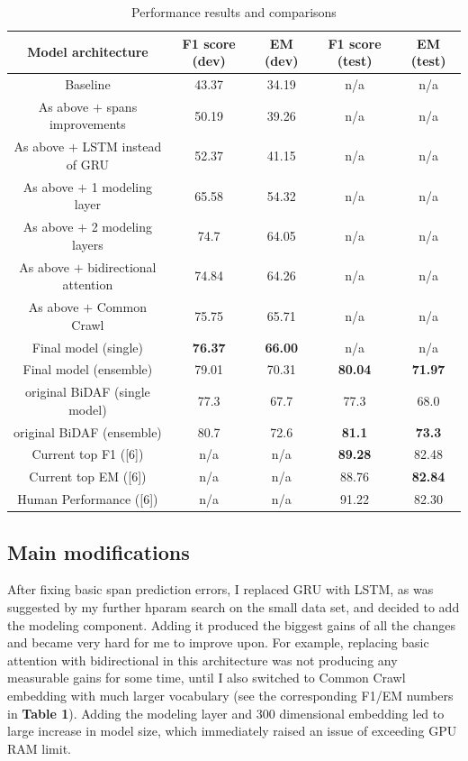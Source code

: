 \documentclass{article}
\begin{document}
\begin{table}[h!]
\centering
\setlength{\arrayrulewidth}{0.5mm}
\begin{tabular}{|c || c | c | c | c |} 
 \hline
 Model architecture & F1 score (dev) & EM (dev) & F1 score (test) & EM (test) \\
 \hline
 Baseline & 43.37 & 34.19 & n/a & n/a \\ 
 As above $+$ spans improvements & 50.19 & 39.26 & n/a & n/a \\
 As above $+$ LSTM instead of GRU & 52.37 & 41.15 & n/a & n/a \\
 As above $+$ 1 modeling layer & 65.58 & 54.32 & n/a & n/a \\
 As above $+$ 2 modeling layers & 74.7 & 64.05 & n/a & n/a \\
 As above $+$ bidirectional attention & 74.84 & 64.26 & n/a & n/a \\
 As above $+$ Common Crawl & 75.75 & 65.71 & n/a & n/a \\
 \hline \hline
 Final model (single) & {\bf 76.37} & {\bf 66.00} & n/a & n/a \\
 Final model (ensemble) & 79.01 & 70.31 & {\bf 80.04} & {\bf 71.97} \\
 \hline
 original BiDAF (single model) & 77.3 & 67.7 & 77.3 & 68.0 \\
 original BiDAF (ensemble) & 80.7 & 72.6 & {\bf 81.1} & {\bf 73.3} \\
 \hline
 Current top F1 ([6]) & n/a & n/a & {\bf 89.28} & 82.48 \\
 Current top EM ([6]) & n/a & n/a & 88.76 & {\bf 82.84} \\
 \hline
 Human Performance ([6]) & n/a & n/a & 91.22 & 82.30 \\
 \hline
\end{tabular}
\captionsetup{format=plain, font=large, labelfont=bf}
\caption{Performance results and comparisons}
\end{table}

\subsection{Main modifications}
After fixing basic span prediction errors, I replaced GRU with LSTM, as was suggested by my further hparam search on the small data set, and decided to add the modeling component. Adding it produced the biggest gains of all the changes and became very hard for me to improve upon. For example, replacing basic attention with bidirectional in this architecture was not producing any measurable gains for some time, until I also switched to Common Crawl embedding with much larger vocabulary (see the corresponding F1/EM numbers in {\bf Table 1}). Adding the modeling layer and 300 dimensional embedding led to large increase in model size, which immediately raised an issue of exceeding GPU RAM limit.
\end{document}
